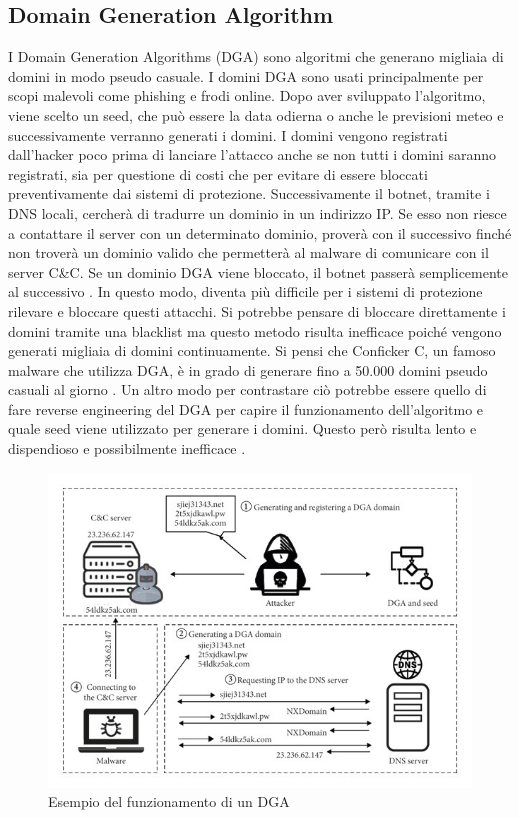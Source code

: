 \documentclass[12pt,a4paper,openright,twoside]{book}
\begin{document}
\subsection{Domain Generation Algorithm}

I Domain Generation Algorithms (DGA) sono algoritmi che generano migliaia di domini in modo pseudo casuale.
I domini DGA sono usati principalmente per scopi malevoli come
phishing e frodi online.
Dopo aver sviluppato l'algoritmo, viene scelto un seed, che può essere la data odierna
o anche le previsioni meteo \cite{8621875} e successivamente
verranno generati i domini.
I domini vengono registrati dall'hacker poco prima di lanciare l'attacco
anche se non tutti i domini saranno registrati, sia per questione di costi
che per evitare di essere bloccati preventivamente dai sistemi di protezione.
Successivamente il botnet, tramite i DNS locali, cercherà di tradurre
un dominio in un indirizzo IP.
Se esso non riesce a contattare il server con un determinato dominio,
proverà con il successivo finché non troverà
un dominio valido che permetterà al malware di comunicare con
il server C\&C. Se un dominio DGA viene bloccato, il botnet passerà semplicemente al successivo \cite{8489147}.
In questo modo, diventa più difficile per i sistemi di protezione
rilevare e bloccare questi attacchi.
Si potrebbe pensare di bloccare direttamente i domini tramite
una blacklist ma questo metodo
risulta inefficace poiché vengono generati migliaia di domini
continuamente. Si pensi che Conficker C, un famoso malware
che utilizza DGA, è in grado di generare
fino a 50.000 domini pseudo casuali al giorno \cite{978131}.
Un altro modo per contrastare ciò
potrebbe essere quello di fare reverse engineering
del DGA per capire il funzionamento dell'algoritmo e quale seed viene utilizzato per generare i domini.
Questo però risulta lento e dispendioso e possibilmente inefficace \cite{8887881}.

\begin{figure}[H]
    \centering
    \includegraphics[width=.8\linewidth]{figures/DGA example.jpg}
    \caption{Esempio del funzionamento di un DGA \cite{8887881}}
    \label{fig:DGA example}
\end{figure}
\end{document}

